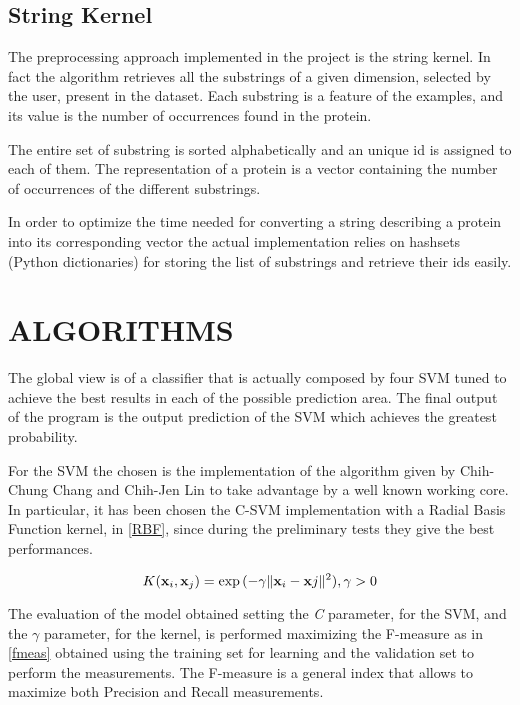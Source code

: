\documentclass{acm_proc_article-sp-sigmod07}
\begin{document}
\subsection{String Kernel}
The preprocessing approach implemented in the project is the string
kernel. In fact the algorithm retrieves all the substrings of a given
dimension, selected by the user, present in the dataset.
Each substring is a feature of the examples, and its value is the number
of occurrences found in the protein. 

The entire set of substring is sorted alphabetically and an unique id is
assigned to each of them. 
The representation of a protein is a vector containing the number of
occurrences of the different substrings.

In order to optimize the time needed for converting a string describing a
protein into its corresponding vector the actual implementation relies on
hashsets (Python dictionaries) for storing the list of substrings and
retrieve their ids easily.

\section{ALGORITHMS}
The global view is of a classifier that is actually composed by four SVM tuned to
achieve the best results in each of the possible prediction area. The final output
of the program is the output prediction of the SVM which achieves the greatest 
probability.

For the SVM the chosen is the implementation of the algorithm given by 
Chih-Chung Chang and Chih-Jen Lin \cite{libSVM} to take advantage by a well 
known working core. 
In particular, it has been chosen the C-SVM implementation with a Radial Basis 
Function kernel, in \ref{RBF}, since during the preliminary tests they give the best 
performances. 

\begin{equation}
 K(\bold{x}_i , \bold{x}_j ) = \exp{(-\gamma\|\bold{x}_i - \bold{x}j\|^2 )}, \gamma > 0
\label{RBF}
\end{equation}

The evaluation of the model obtained setting the \emph{C} parameter, for
the SVM, and the $ \gamma $ parameter, for the kernel, is performed maximizing 
the F-measure as in \ref{fmeas} obtained using the training set for learning and
the validation set to perform the measurements. The F-measure is a general index
that allows to maximize both Precision and Recall measurements.
\end{document}
